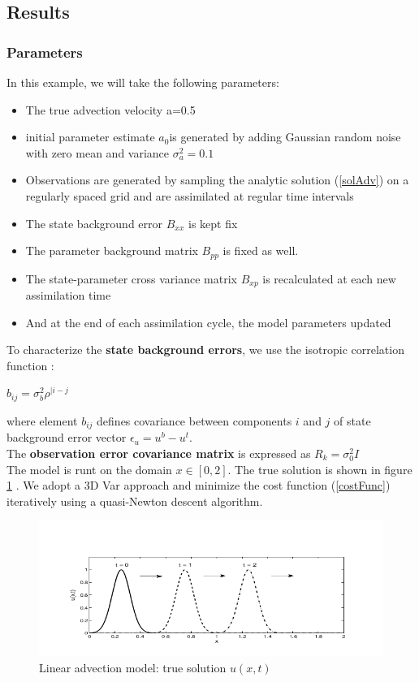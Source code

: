 \documentclass[a4,12pt]{article}
\numberwithin{equation}{section}
\begin{document}
\subsection{Results}
\subsubsection{Parameters}
In this example, we will take the following parameters:
\begin{itemize}
\item The true advection velocity a=0.5
\item initial parameter estimate $a_0 $is generated by adding Gaussian random noise with zero mean and variance $\sigma_a^2 = 0.1$
\item Observations are generated by sampling the analytic solution (\ref{solAdv}) on a regularly spaced grid and are assimilated at regular time intervals
\item The state background error $B_{xx}$ is kept fix
\item The parameter background matrix $B_{pp}$ is fixed as well.
\item The state-parameter cross variance matrix $B_{xp}$ is recalculated at each new assimilation time
\item And at the end of each assimilation cycle, the model parameters updated
\end{itemize}
To characterize the \textbf{state background errors}, we use the isotropic correlation function :
\begin{center}
    $b_{ij} = \sigma_b^2 \rho ^{|i-j} $
\end{center}
where element $b_{ij}$ defines covariance between components $i$ and $j$ of state background error vector $\epsilon_u = u^b - u^t$. \\
The \textbf{observation error covariance matrix} is expressed as 
$R_k = \sigma_0^2 I$ \\
The model is runt on the domain $x \in [0,2]$.
The true solution is shown in figure \ref{trueSol} \cite{HybridSequential}.
We adopt a 3D Var approach and minimize the cost function (\ref{costFunc}) iteratively using a quasi-Newton descent algorithm.

\begin{figure}[h]
    \begin{center}
    \includegraphics[width=15cm]{../Image/trueSolAdvection.png}
    \caption{Linear advection model: true solution $u(x, t)$}
    \label{trueSol}
    \end{center}
\end{figure}
\end{document}
